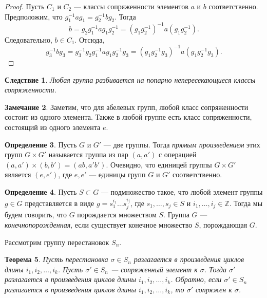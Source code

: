\documentclass[12pt, titlepage, oneside]{amsbook}
\newcommand{\ZZ}{\mathbb{Z}}
\newtheorem{theorem}{Теорема}[chapter]
\newtheorem{corollary}[theorem]{Следствие}
\theoremstyle{definition}
\newtheorem{definition}[theorem]{Определение}
\newtheorem{remark}[theorem]{Замечание}
\theoremstyle{remark}
\begin{document}
\begin{proof}
	Пусть $C_1$ и $C_2$ --- классы сопряженности элементов $a$ и $b$ соответственно. Предположим, что $g_1^{-1}a g_1=g_2^{-1}b g_2$. Тогда $$b=g_2g_1^{-1}a g_1 g_2^{-1}=(g_1g_2^{-1})^{-1}a(g_1 g_2^{-1}).$$ Следовательно, $b\in C_1$. Отсюда, $$g_3^{-1}b g_3=g_3^{-1}g_2g_1^{-1}a g_1 g_2^{-1}g_3=(g_1g_2^{-1}g_3)^{-1}a(g_1 g_2^{-1}g_3).$$
\end{proof}

\begin{corollary}
	\label{Sopr2} Любая группа разбивается на попарно непересекающиеся классы сопряженности.
\end{corollary}

\begin{remark}
	Заметим, что для абелевых групп, любой класс сопряженности состоит из одного элемента. Также в любой группе есть класс сопряженности, состоящий из одного элемента $e$.
\end{remark}

\begin{definition}
	Пусть $G$ и $G'$ --- две группы. Тогда \emph{прямым произведением}
	этих групп $G\times G'$ называется группа из пар $(a,a')$ с операцией
	$(a,a')\times (b,b')=(ab,a'b')$. Очевидно, что единицей группы $G\times G'$ является $(e,e')$, где $e,e'$ --- единицы групп $G$ и $G'$ соответственно.
\end{definition}

\begin{definition}
	Пусть $S\subset G$ --- подмножество такое, что любой элемент группы
	$g\in G$ представляется в виде $g=s_1^{i_1}\dots s_j^{i_j}$, где
	$s_1,\dots, s_j\in S$ и $i_1,\dots, i_j\in\ZZ$. Тогда мы будем
	говорить, что $G$ порождается множеством $S$. Группа $G$ ---
	\emph{конечнопорожденная}, если существует конечное множество $S$,
	порождающая $G$.
\end{definition}

Рассмотрим группу перестановок $S_n$.

\begin{theorem}
	\label{Gr2}
	Пусть перестановка $\sigma\in S_n$ разлагается в произведения циклов длины $i_1,i_2,\ldots,i_k$. Пусть $\sigma'\in S_n$ --- сопряженный элемент к $\sigma$. Тогда $\sigma'$ разлагается в произведения циклов длины $i_1,i_2,\ldots,i_k$. Обратно, если $\sigma'\in S_n$ разлагается в произведения циклов длины $i_1,i_2,\ldots,i_k$, то $\sigma'$ сопряжен к $\sigma$.
\end{theorem}
\end{document}
